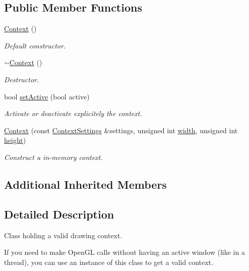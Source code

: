 \subsection*{Public Member Functions}
\begin{DoxyCompactItemize}
\item 
\hyperlink{classsf_1_1_context_aba22797a790706ca2c5c04ee39f2b555}{Context} ()
\begin{DoxyCompactList}\small\item\em Default constructor. \end{DoxyCompactList}\item 
\hyperlink{classsf_1_1_context_a805b1bbdb3e52b1fda7c9bf2cd6ca86b}{$\sim$\-Context} ()
\begin{DoxyCompactList}\small\item\em Destructor. \end{DoxyCompactList}\item 
bool \hyperlink{classsf_1_1_context_a0806f915ea81ae1f4e8135a7a3696562}{set\-Active} (bool active)
\begin{DoxyCompactList}\small\item\em Activate or deactivate explicitely the context. \end{DoxyCompactList}\item 
\hyperlink{classsf_1_1_context_a2a9e3529e48919120e6b6fc10bad296c}{Context} (const \hyperlink{structsf_1_1_context_settings}{Context\-Settings} \&settings, unsigned int \hyperlink{gl3_8h_a9d14ddc31c6c8b61f3fe3679ab976133}{width}, unsigned int \hyperlink{gl3_8h_a67001679ebf2bb0ba972db4d29c6550c}{height})
\begin{DoxyCompactList}\small\item\em Construct a in-\/memory context. \end{DoxyCompactList}\end{DoxyCompactItemize}
\subsection*{Additional Inherited Members}


\subsection{Detailed Description}
Class holding a valid drawing context. 

If you need to make Open\-G\-L calls without having an active window (like in a thread), you can use an instance of this class to get a valid context.

